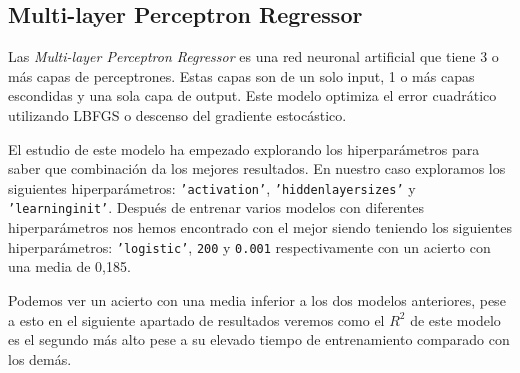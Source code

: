 \subsection{Multi-layer Perceptron Regressor}
Las \textit{Multi-layer Perceptron Regressor} es una red neuronal artificial que tiene 3 o más capas de perceptrones. Estas capas son de un solo input, 1 o más capas escondidas y una sola capa de output. Este modelo optimiza el error cuadrático utilizando LBFGS o descenso del gradiente estocástico.
\newline

El estudio de este modelo ha empezado explorando los hiperparámetros para saber que combinación da los mejores resultados. En nuestro caso exploramos los siguientes hiperparámetros: \texttt{'activation'}, \texttt{'hidden\textunderscore layer\textunderscore sizes'} y \texttt{'learning\textunderscore init'}. Después de entrenar varios modelos con diferentes hiperparámetros nos hemos encontrado con el mejor siendo teniendo los siguientes hiperparámetros: \texttt{'logistic'}, \texttt{200} y \texttt{0.001} respectivamente con un acierto con una media de 0,185.
\newline

Podemos ver un acierto con una media inferior a los dos modelos anteriores, pese a esto en el siguiente apartado de resultados veremos como el $R^2$ de este modelo es el segundo más alto pese a su elevado tiempo de entrenamiento comparado con los demás.